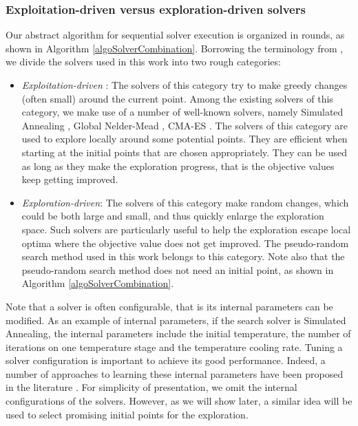 \subsubsection*{Exploitation-driven versus exploration-driven solvers}
Our abstract algorithm for sequential solver execution is organized in rounds, as shown in Algorithm \ref{algoSolverCombination}. Borrowing the terminology from \cite{}, we divide the solvers used in this work into two rough categories: 
\begin{itemize}
\item {\em Exploitation-driven} : The solvers of this category try to make greedy changes (often small) around the current point. Among the existing solvers of this category, we make use of a number of well-known solvers, namely Simulated Annealing \cite{}, Global Nelder-Mead \cite{}, CMA-ES \cite{}. The solvers of this category are used to explore locally around some potential points. They are efficient when starting at the initial points that are chosen appropriately. They can be used as long as they make the exploration progress, that is the objective values keep getting improved.
\item {\em Exploration-driven}: The solvers of this category make random changes, which could be both large and small, and thus quickly enlarge the exploration space. Such solvers are particularly useful to help the exploration escape local optima where the objective value does not get improved. The pseudo-random search method used in this work belongs to this category. Note also that the pseudo-random search method does not need an initial point, as shown in Algorithm \ref{algoSolverCombination}. 
\end{itemize}

Note that a solver is often configurable, that is its internal parameters can be modified. As an example of internal parameters, if the search solver is Simulated Annealing, the internal parameters include the initial temperature, the number of iterations on one temperature stage and the temperature cooling rate. Tuning a solver configuration is important to achieve its good performance. Indeed, a number of approaches to learning these internal parameters have been proposed in the literature \cite{}. For simplicity of presentation, we omit the internal configurations of the solvers. However, as we will show later, a similar idea will be used to select promising initial points for the exploration. 

